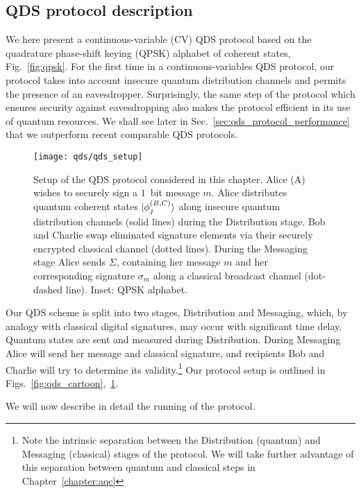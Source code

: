 \FloatBarrier
\subsection{QDS protocol description}

We here present a continuous-variable (CV) QDS protocol based on the quadrature phase-shift keying (QPSK) alphabet of coherent states, Fig.~\ref{fig:qpsk}. For the first time in a continuous-variables QDS protocol, our protocol takes into account insecure quantum distribution channels and permits the presence of an eavesdropper. Surprisingly, the same step of the protocol which ensures security against eavesdropping also makes the protocol efficient in its use of quantum resources. We shall see later in Sec.~\ref{sec:qds_protocol_performance} that we outperform recent comparable QDS protocols.

\begin{figure}[htp]
\captionsetup{width=0.8\linewidth}
\centering
\texttt{[image: qds/qds\_setup]}
\caption{\label{fig:qds_setup} Setup of the QDS protocol considered in this chapter. Alice (A) wishes to securely sign a $1$~bit message $m$. Alice distributes quantum coherent states $\ket{\phi_j^{\left(B, C\right)}}$ along insecure quantum distribution channels (solid lines) during the Distribution stage. Bob and Charlie swap eliminated signature elements via their securely encrypted classical channel (dotted lines). During the Messaging stage Alice sends $\Sigma$, containing her message $m$ and her corresponding signature $\sigma_m$ along a classical broadcast channel (dot-dashed line). Inset: QPSK alphabet.}
\end{figure}


Our QDS scheme is split into two stages, Distribution and Messaging, which, by analogy with classical digital signatures, may occur with significant time delay. Quantum states are sent and measured during Distribution. During Messaging Alice will send her message and classical signature, and recipients Bob and Charlie will try to determine its validity.\footnote{Note the intrinsic separation between the Distribution (quantum) and Messaging (classical) stages of the protocol. We will take further advantage of this separation between quantum and classical steps in Chapter~\ref{chapter:aqc}} Our protocol setup is outlined in Figs.~\ref{fig:qds_cartoon},~\ref{fig:qds_setup}. 
\par
\noindent We will now describe in detail the running of the protocol.



